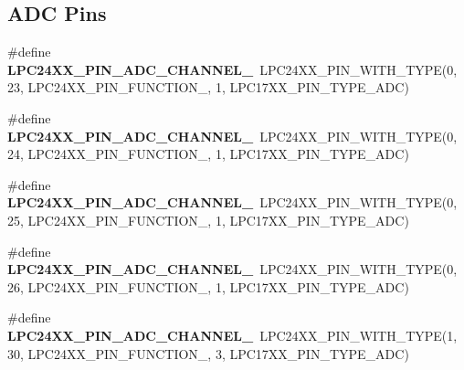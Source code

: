 \subsection*{A\+DC Pins}
\begin{DoxyCompactItemize}
\item 
\mbox{\label{group__lpc24xx__io_ga1403783536d820e539143d164dd78b85}} 
\#define {\bfseries L\+P\+C24\+X\+X\+\_\+\+P\+I\+N\+\_\+\+A\+D\+C\+\_\+\+C\+H\+A\+N\+N\+E\+L\+\_}~L\+P\+C24\+X\+X\+\_\+\+P\+I\+N\+\_\+\+W\+I\+T\+H\+\_\+\+T\+Y\+PE(0, 23, L\+P\+C24\+X\+X\+\_\+\+P\+I\+N\+\_\+\+F\+U\+N\+C\+T\+I\+O\+N\+\_, 1, L\+P\+C17\+X\+X\+\_\+\+P\+I\+N\+\_\+\+T\+Y\+P\+E\+\_\+\+A\+DC)
\item 
\mbox{\label{group__lpc24xx__io_gaa9e6c54fc38e3baadbb87b1963b5a851}} 
\#define {\bfseries L\+P\+C24\+X\+X\+\_\+\+P\+I\+N\+\_\+\+A\+D\+C\+\_\+\+C\+H\+A\+N\+N\+E\+L\+\_}~L\+P\+C24\+X\+X\+\_\+\+P\+I\+N\+\_\+\+W\+I\+T\+H\+\_\+\+T\+Y\+PE(0, 24, L\+P\+C24\+X\+X\+\_\+\+P\+I\+N\+\_\+\+F\+U\+N\+C\+T\+I\+O\+N\+\_, 1, L\+P\+C17\+X\+X\+\_\+\+P\+I\+N\+\_\+\+T\+Y\+P\+E\+\_\+\+A\+DC)
\item 
\mbox{\label{group__lpc24xx__io_ga04216474be5b4326563c83e7245e5765}} 
\#define {\bfseries L\+P\+C24\+X\+X\+\_\+\+P\+I\+N\+\_\+\+A\+D\+C\+\_\+\+C\+H\+A\+N\+N\+E\+L\+\_}~L\+P\+C24\+X\+X\+\_\+\+P\+I\+N\+\_\+\+W\+I\+T\+H\+\_\+\+T\+Y\+PE(0, 25, L\+P\+C24\+X\+X\+\_\+\+P\+I\+N\+\_\+\+F\+U\+N\+C\+T\+I\+O\+N\+\_, 1, L\+P\+C17\+X\+X\+\_\+\+P\+I\+N\+\_\+\+T\+Y\+P\+E\+\_\+\+A\+DC)
\item 
\mbox{\label{group__lpc24xx__io_ga33f651b5980094ac45efa72bd70be202}} 
\#define {\bfseries L\+P\+C24\+X\+X\+\_\+\+P\+I\+N\+\_\+\+A\+D\+C\+\_\+\+C\+H\+A\+N\+N\+E\+L\+\_}~L\+P\+C24\+X\+X\+\_\+\+P\+I\+N\+\_\+\+W\+I\+T\+H\+\_\+\+T\+Y\+PE(0, 26, L\+P\+C24\+X\+X\+\_\+\+P\+I\+N\+\_\+\+F\+U\+N\+C\+T\+I\+O\+N\+\_, 1, L\+P\+C17\+X\+X\+\_\+\+P\+I\+N\+\_\+\+T\+Y\+P\+E\+\_\+\+A\+DC)
\item 
\mbox{\label{group__lpc24xx__io_gabc59d3024c6678bf2ee1f885bdb27382}} 
\#define {\bfseries L\+P\+C24\+X\+X\+\_\+\+P\+I\+N\+\_\+\+A\+D\+C\+\_\+\+C\+H\+A\+N\+N\+E\+L\+\_}~L\+P\+C24\+X\+X\+\_\+\+P\+I\+N\+\_\+\+W\+I\+T\+H\+\_\+\+T\+Y\+PE(1, 30, L\+P\+C24\+X\+X\+\_\+\+P\+I\+N\+\_\+\+F\+U\+N\+C\+T\+I\+O\+N\+\_, 3, L\+P\+C17\+X\+X\+\_\+\+P\+I\+N\+\_\+\+T\+Y\+P\+E\+\_\+\+A\+DC)

\end{DoxyCompactItemize}
